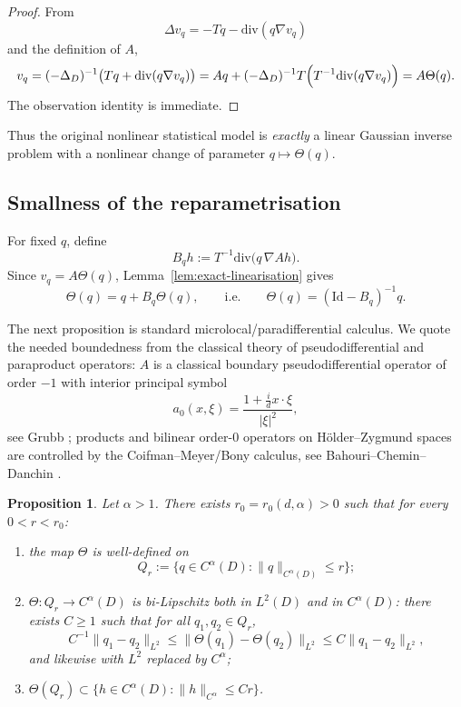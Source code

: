 \documentclass[11pt]{article}
\newtheorem{proposition}[theorem]{Proposition}
\newcommand{\Id}{\mathrm{Id}}
\newcommand{\diver}{\mathrm{div}}
\begin{document}
\begin{proof}
From
\[
\Delta v_q=-Tq-\diver(q\nabla v_q)
\]
and the definition of $A$,
\[
v_q
=
(-\Delta_D)^{-1}\bigl(Tq+\diver(q\nabla v_q)\bigr)
=
Aq+(-\Delta_D)^{-1}T\Bigl(T^{-1}\diver(q\nabla v_q)\Bigr)
=
A\Theta(q).
\]
The observation identity is immediate.
\end{proof}

Thus the original nonlinear statistical model is \emph{exactly} a linear Gaussian inverse problem with a nonlinear change of parameter $q\mapsto \Theta(q)$.

\subsection*{Smallness of the reparametrisation}

For fixed $q$, define
\[
B_q h:=T^{-1}\diver\bigl(q\,\nabla Ah\bigr).
\]
Since $v_q=A\Theta(q)$, Lemma~\ref{lem:exact-linearisation} gives
\[
\Theta(q)=q+B_q\Theta(q),
\qquad\text{i.e.}\qquad
\Theta(q)=(\Id-B_q)^{-1}q.
\]

The next proposition is standard microlocal/paradifferential calculus. We quote the needed boundedness from the classical theory of pseudodifferential and paraproduct operators: $A$ is a classical boundary pseudodifferential operator of order $-1$ with interior principal symbol
\[
a_0(x,\xi)=\frac{1+\frac{i}{d}x\cdot \xi}{|\xi|^2},
\]
see Grubb \cite[Ch.~2--3]{Grubb}; products and bilinear order-$0$ operators on Hölder--Zygmund spaces are controlled by the Coifman--Meyer/Bony calculus, see Bahouri--Chemin--Danchin \cite[Ch.~2]{BCD}.

\begin{proposition}\label{prop:Theta}
Let $\alpha>1$. There exists $r_0=r_0(d,\alpha)>0$ such that for every $0<r<r_0$:
\begin{enumerate}
\item the map $\Theta$ is well-defined on
\[
Q_r:=\{q\in C^\alpha(D):\|q\|_{C^\alpha(D)}\le r\};
\]
\item $\Theta:Q_r\to C^\alpha(D)$ is bi-Lipschitz both in $L^2(D)$ and in $C^\alpha(D)$:
there exists $C\ge 1$ such that for all $q_1,q_2\in Q_r$,
\[
C^{-1}\|q_1-q_2\|_{L^2}
\le
\|\Theta(q_1)-\Theta(q_2)\|_{L^2}
\le
C\|q_1-q_2\|_{L^2},
\]
and likewise with $L^2$ replaced by $C^\alpha$;
\item $\Theta(Q_r)\subset \{h\in C^\alpha(D): \|h\|_{C^\alpha}\le Cr\}$.
\end{enumerate}
\end{proposition}
\end{document}
